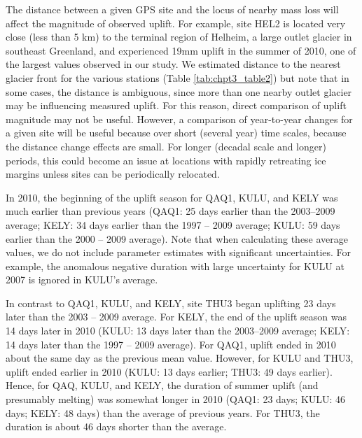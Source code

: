 The distance between a given GPS site and the
locus of nearby mass loss will affect the magnitude
of observed uplift. For example, site HEL2 is located
very close (less than 5 km) to the terminal region
of Helheim, a large outlet glacier in southeast
Greenland, and experienced 19mm uplift in the
summer of 2010, one of the largest values observed
in our study. We estimated distance to the nearest
glacier front for the various stations (Table \ref{tab:chpt3_table2}) but
note that in some cases, the distance is ambiguous,
since more than one nearby outlet glacier may be
influencing measured uplift. For this reason, direct
comparison of uplift magnitude may not be useful.
However, a comparison of year-to-year changes for
a given site will be useful because over short
(several year) time scales, because the distance
change effects are small. For longer (decadal scale
and longer) periods, this could become an issue at
locations with rapidly retreating ice margins unless
sites can be periodically relocated.

In 2010, the beginning of the uplift season for
QAQ1, KULU, and KELY was much earlier than
previous years (QAQ1: 25 days earlier than the
2003–2009 average; KELY: 34 days earlier than
the 1997 – 2009 average; KULU: 59 days earlier
than the 2000 – 2009 average). Note that when
calculating these average values, we do not include
parameter estimates with significant uncertainties.
For example, the anomalous negative duration with
large uncertainty for KULU at 2007 is ignored in
KULU’s average.

In contrast to QAQ1, KULU, and KELY, site
THU3 began uplifting 23 days later than the 2003 –
2009 average. For KELY, the end of the uplift season
was 14 days later in 2010 (KULU: 13 days later than
the 2003–2009 average; KELY: 14 days later than
the 1997 – 2009 average). For QAQ1, uplift ended
in 2010 about the same day as the previous mean
value. However, for KULU and THU3, uplift ended
earlier in 2010 (KULU: 13 days earlier; THU3:
49 days earlier). Hence, for QAQ, KULU, and
KELY, the duration of summer uplift (and presumably
melting) was somewhat longer in 2010
(QAQ1: 23 days; KULU: 46 days; KELY: 48 days)
than the average of previous years. For THU3, the
duration is about 46 days shorter than the average.

